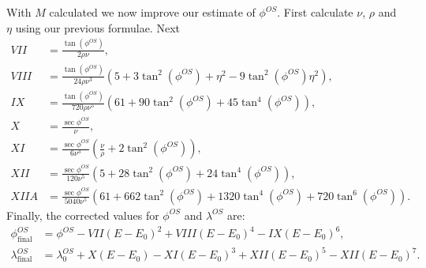 \documentclass[letterpaper,10pt,english]{sphinxmanual}
\begin{document}
\sphinxAtStartPar
With \(M\) calculated we now improve our estimate of \(\phi^{OS}\). First calculate
\(\nu\), \(\rho\) and \(\eta\) using our previous formulae. Next
\begin{equation*}
\begin{split}VII &= \frac{\tan(\phi^{OS})}{2\rho\nu},\\
VIII &= \frac{\tan(\phi^{OS})}{24\rho\nu^3}\left(5+3\tan^2(\phi^{OS})+\eta^2-9\tan^2(\phi^{OS})\eta^2\right),\\
IX &= \frac{\tan(\phi^{OS})}{720\rho\nu^5}\left(61+90\tan^2(\phi^{OS})+45\tan^4(\phi^{OS})\right),\\
X &= \frac{\sec\phi^{OS}}{\nu}, \\
XI &= \frac{\sec\phi^{OS}}{6\nu^3}\left(\frac{\nu}{\rho}+2\tan^2(\phi^{OS})\right), \\
XII &= \frac{\sec\phi^{OS}}{120\nu^5}\left(5+28\tan^2(\phi^{OS})+24\tan^4(\phi^{OS})\right), \\
XIIA &= \frac{\sec\phi^{OS}}{5040\nu^5}\left(61+662\tan^2(\phi^{OS})+1320\tan^4(\phi^{OS})+720\tan^6(\phi^{OS})\right).\end{split}
\end{equation*}
\sphinxAtStartPar
Finally, the corrected values for \(\phi^{OS}\) and \(\lambda^{OS}\) are:
\begin{equation*}
\begin{split}\phi_{\textrm{final}}^{OS} &= \phi^{OS} -VII(E-E_0)^2 +VIII(E-E_0)^4 -IX(E-E_0)^6, \\
\lambda_{\textrm{final}}^{OS} &= \lambda_0^{OS}+X(E-E_0)-XI(E-E_0)^3+ XII(E-E_0)^5-XII(E-E_0)^7.\end{split}
\end{equation*}
\end{document}
